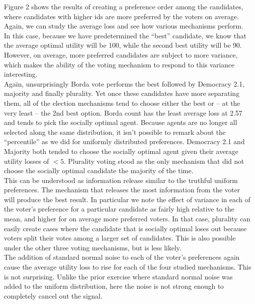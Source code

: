 \documentclass[11pt]{scrartcl}
\begin{document}
Figure 2 shows the results of creating a preference order among the candidates, where candidates with higher ids are more preferred by the voters on average. Again, we can study the average loss and see how various mechanisms perform. In this case, because we have predetermined the ``best'' candidate, we know that the average optimal utility will be 100, while the second best utility will be 90. However, on average, more preferred candidates are subject to more variance, which makes the ability of the voting mechanism to respond to this variance interesting.\\

Again, unsurprisingly Borda vote performs the best followed by Democracy 2.1, majority and finally plurality. Yet once these candidates have more separating them, all of the election mechanisms tend to choose either the best or -- at the very least -- the 2nd best option. Borda count has the least average loss at 2.57 and tends to pick the socially optimal agent. Because agents are no longer all selected along the same distribution, it isn't possible to remark about the ``percentile'' as we did for uniformly distributed preferences. Democracy 2.1 and Majority both tended to choose the socially optimal agent given their average utility losses of $<5$. Plurality voting stood as the only mechanism that did not choose the socially optimal candidate the majority of the time.\\

This can be understood as information release similar to the truthful uniform preferences. The mechanism that releases the most information from the voter will produce the best result. In particular we note the effect of variance in each of the voter's preference for a particular candidate as fairly high relative to the mean, and higher for on average more preferred voters. In that case, plurality can easily create cases where the candidate that is socially optimal loses out because voters split their votes among a larger set of candidates. This is also possible under the other three voting mechanisms, but is less likely.\\

The addition of standard normal noise to each of the voter's preferences again cause the average utility loss to rise for each of the four studied mechanisms. This is not surprising. Unlike the prior exercise where standard normal noise was added to the uniform distribution, here the noise is not strong enough to completely cancel out the signal.\\
\end{document}
